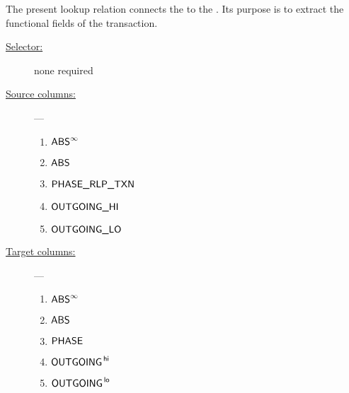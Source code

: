The present lookup relation connects the \txnDataMod{} to the \rlpTxnMod{}. Its purpose is to extract the functional fields of the transaction. 
\begin{description}
	\item[\underline{Selector:}] none required
	\item[\underline{Source columns:}] ---
		\begin{multicols}{3}
			\begin{enumerate}
				\item $\textsf{ABS}^\infty$
				\item $\textsf{ABS}$
				\item $\textsf{PHASE\_RLP\_TXN}$
				\item $\textsf{OUTGOING}\textsf{\_HI}$
				\item $\textsf{OUTGOING}\textsf{\_LO}$
			\end{enumerate}
		\end{multicols}
	\item[\underline{Target columns:}] ---
		\begin{multicols}{3}
			\begin{enumerate}
				\item $\textsf{ABS}^\infty$
				\item $\textsf{ABS}$
				\item $\textsf{PHASE}$
				\item $\textsf{OUTGOING}^{\mathsf{\,hi}}$
				\item $\textsf{OUTGOING}^{\mathsf{\,lo}}$
			\end{enumerate}
		\end{multicols}
\end{description}


